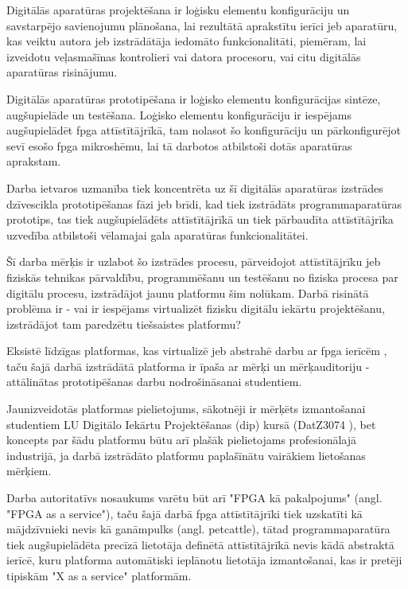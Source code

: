 Digitālās aparatūras projektēšana ir loģisku elementu konfigurāciju un
savstarpējo savienojumu plānošana, lai rezultātā aprakstītu ierīci jeb
aparatūru, kas veiktu autora jeb izstrādātāja iedomāto funkcionalitāti,
piemēram, lai izveidotu veļasmašīnas kontrolieri vai datora procesoru, vai citu
digitālās aparatūras risinājumu.  
  
Digitālās aparatūras prototipēšana ir loģisko elementu konfigurācijas sintēze,
augšupielāde un testēšana. Loģisko elementu konfigurāciju ir iespējams
augšupielādēt \gls{fpga} attīstītājrīkā, tam nolasot šo konfigurāciju un
pārkonfigurējot sevī esošo \gls{fpga} mikroshēmu, lai tā darbotos atbilstoši
dotās aparatūras aprakstam. \cite[para. II]{HerreraAlzu2013}  
  
Darba ietvaros uzmanība tiek koncentrēta uz šī digitālās aparatūras izstrādes
dzīvescikla prototipēšanas fāzi jeb brīdi, kad tiek izstrādāts
programmaparatūras prototips, tas tiek augšupielādēts attīstītājrīkā un tiek
pārbaudīta attīstītājrīka uzvedība atbilstoši vēlamajai gala aparatūras
funkcionalitātei.

Šī darba mērķis ir uzlabot šo izstrādes procesu, pārveidojot attīstītājrīku jeb
fiziskās tehnikas pārvaldību, programmēšanu un testēšanu no fiziska procesa par
digitālu procesu, izstrādājot jaunu platformu šim nolūkam. Darbā risinātā
problēma ir - vai ir iespējams virtualizēt fizisku digitālu iekārtu
projektēšanu, izstrādājot tam paredzētu tiešsaistes platformu?

Eksistē līdzīgas platformas, kas virtualizē jeb abstrahē darbu ar \gls{fpga}
ierīcēm \cite[para. I]{VaishnavAnuj2018}, taču šajā darbā izstrādātā platforma
ir īpaša ar mērķi un mērķauditoriju - attālinātas prototipēšanas darbu
nodrošināsanai studentiem. 

Jaunizveidotās platformas pielietojums, sākotnēji ir mērķēts izmantošanai
studentiem LU Digitālo Iekārtu Projektēšanas (\gls{dip}) kursā (DatZ3074
\cite{DatZ3074}), bet koncepts par šādu platformu būtu arī plašāk pielietojams
profesionālajā industrijā, ja darbā izstrādāto platformu paplašīnātu vairākiem
lietošanas mērķiem.

Darba autoritatīvs nosaukums varētu būt arī "FPGA kā pakalpojums" (angl. "FPGA
as a service"), taču šajā darbā \gls{fpga} attīstītājrīki tiek uzskatīti kā
mājdzīvnieki nevis kā ganāmpulks (angl. \gls{petcattle}), tātad
programmaparatūra tiek augšupielādēta precīzā lietotāja definētā attīstītājrīkā
nevis kādā abstraktā ierīcē, kuru platforma automātiski ieplānotu lietotāja
izmantošanai, kas ir pretēji tipiskām "X as a service" platformām.

